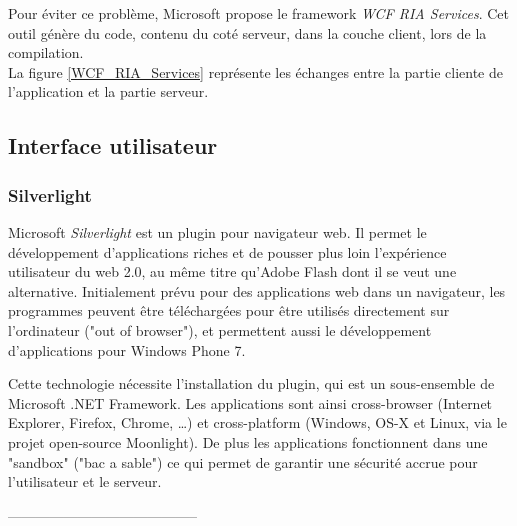 Pour éviter ce problème, Microsoft propose le framework \textit{WCF RIA Services}. Cet outil génère du code, contenu du coté serveur, dans la couche client, lors de la compilation.
\\


La figure \ref{WCF_RIA_Services} représente les échanges entre la partie cliente de l'application et la partie serveur.


\subsection{Interface utilisateur}


\subsubsection{Silverlight}

Microsoft \textit{Silverlight} est un plugin pour navigateur web. Il permet le développement d'applications riches et de pousser plus loin l'expérience utilisateur du web 2.0, au même titre qu'Adobe Flash dont il se veut une alternative. Initialement prévu pour des applications web dans un navigateur, les programmes peuvent être téléchargées pour être utilisés directement sur l'ordinateur ("out of browser"), et permettent aussi le développement d'applications pour Windows Phone 7.

Cette technologie nécessite l'installation du plugin, qui est un sous-ensemble de Microsoft .NET Framework. Les applications sont ainsi cross-browser (Internet Explorer, Firefox, Chrome, \ldots) et cross-platform (Windows, OS-X et Linux, via le projet open-source Moonlight). De plus les applications fonctionnent dans une "sandbox" ("bac a sable") ce qui permet de garantir une sécurité accrue pour l'utilisateur et le serveur.







-----------------------------------------






